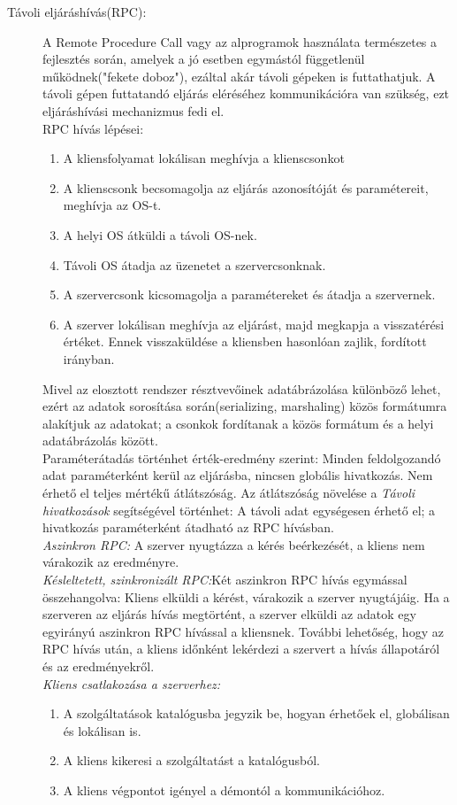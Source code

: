 \documentclass[12pt]{article}
\begin{document}
\begin{description}
\item[Távoli eljáráshívás(RPC):] A Remote Procedure Call vagy az alprogramok használata természetes a fejlesztés során, amelyek a jó esetben egymástól függetlenül működnek("fekete doboz"), ezáltal akár távoli gépeken is futtathatjuk. A távoli gépen futtatandó eljárás eléréséhez kommunikációra van szükség, ezt eljáráshívási mechanizmus fedi el.\\RPC hívás lépései:\\\begin{enumerate}\item A kliensfolyamat lokálisan meghívja a klienscsonkot\item A klienscsonk becsomagolja az eljárás azonosítóját és paramétereit, meghívja az OS-t.\item A helyi OS átküldi a távoli OS-nek.\item Távoli OS átadja az üzenetet a szervercsonknak. \item A szervercsonk kicsomagolja a paramétereket és átadja a szervernek.\item A szerver lokálisan meghívja az eljárást, majd megkapja a visszatérési értéket. Ennek visszaküldése a kliensben hasonlóan zajlik, fordított irányban.\end{enumerate}Mivel az elosztott rendszer résztvevőinek adatábrázolása különböző lehet, ezért az adatok sorosítása során(serializing, marshaling) közös formátumra alakítjuk az adatokat; a csonkok fordítanak a közös formátum és a helyi adatábrázolás között.\\Paraméterátadás történhet érték-eredmény szerint: Minden feldolgozandó adat paraméterként kerül az eljárásba, nincsen globális hivatkozás. Nem érhető el teljes mértékű átlátszóság. Az átlátszóság növelése a \textit{Távoli hivatkozások} segítségével történhet: A távoli adat egységesen érhető el; a hivatkozás paraméterként átadható az RPC hívásban.\\\textit{Aszinkron RPC:} A szerver nyugtázza a kérés beérkezését, a kliens nem várakozik az eredményre.\\\textit{Késleltetett, szinkronizált RPC:}Két aszinkron RPC hívás egymással összehangolva: Kliens elküldi a kérést, várakozik a szerver nyugtájáig. Ha a szerveren az eljárás hívás megtörtént, a szerver elküldi az adatok egy egyirányú aszinkron RPC hívással a kliensnek. További lehetőség, hogy az RPC hívás után, a kliens időnként lekérdezi a szervert a hívás állapotáról és az eredményekről.\\\textit{Kliens csatlakozása a szerverhez:}\begin{enumerate}\item A szolgáltatások katalógusba jegyzik be, hogyan érhetőek el, globálisan és lokálisan is.\item A kliens kikeresi a szolgáltatást a katalógusból.\item A kliens végpontot igényel a démontól a kommunikációhoz.\end{enumerate}
\end{description}
\end{document}
